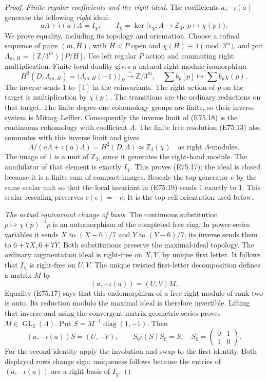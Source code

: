 \begin{proof}
\emph{Finite regular coefficients and the right ideal.}
The coefficients $a,-\iota(a)$ generate the
following \emph{right} ideal:
\[
 a\Lambda+\iota(a)\Lambda=I_\chi,
 \qquad
 I_\chi=\ker\bigl(\epsilon_\chi:\Lambda\to\mathbb Z_3,
                         \ p\mapsto\chi(p)\bigr).
 \tag{E75.17}
\]
We prove equality, including its topology and
orientation. Choose a cofinal sequence of pairs
$(m,H)$, with $H\triangleleft P$ open and
$\chi(H)\equiv1\pmod{3^m}$, and put
$\Lambda_{m,H}=(\mathbb Z/3^m)[P/H]$.
Use left regular $P$ action and commuting
right multiplication. Finite local duality
\cite[I, Theorem2.1 and Corollary2.3]{E_MilneADT}
gives a natural right-module isomorphism
\[
 H^2(D,\Lambda_{m,H})
   =\bigl(\Lambda_{m,H}(-1)\bigr)_P
   \xrightarrow{\sim}\mathbb Z/3^m,
 \quad
 \sum b_p[p]\longmapsto\sum b_p\chi(p).
 \tag{E75.18}
\]
The inverse sends $1$ to $[1]$ in the
coinvariants. The right action of $p$ on the
target is multiplication by $\chi(p)$.
The transitions are the ordinary reductions
on that target. The finite degree-one
cohomology groups are finite, so their inverse
system is Mittag--Leffler. Consequently the
inverse limit of (E75.18) is the continuous
cohomology with coefficient $\Lambda$.
The finite free resolution (E75.13) also
commutes with this inverse limit and gives
\[
 \Lambda/(a\Lambda+\iota(a)\Lambda)
       =H^2(D,\Lambda)\simeq\mathbb Z_3(\chi)
       \quad\text{as right }\Lambda\text{-modules}.
 \tag{E75.19}
\]
The image of $1$ is a unit of $\mathbb Z_3$,
since it generates the right-hand module.
The annihilator of that element is exactly
$I_\chi$. This proves (E75.17); the ideal is
closed because it is a finite sum of compact
images. Rescale the top generator $e$ by the
same scalar unit so that the local invariant
in (E75.19) sends $1$ exactly to $1$.
This scalar rescaling preserves $c(e)=-e$.
It is the top-cell orientation used below.

\emph{The actual equivariant change of basis.}
The continuous substitution $p\mapsto\chi(p)^{-1}p$
is an automorphism of the completed free ring.
In power-series variables it sends
$X$ to $(X-6)/7$ and $Y$ to $(Y-6)/7$;
its inverse sends them to $6+7X,6+7Y$.
Both substitutions preserve the maximal-ideal
topology. The ordinary augmentation ideal is
right-free on $X,Y$, by unique first letter.
It follows that $I_\chi$ is right-free on
$U,V$. The unique twisted first-letter
decomposition defines a matrix $M$ by
\[
 (a,-\iota(a))=(U,V)M.
 \tag{E75.20}
\]
Equality (E75.17) says that this endomorphism
of a free right module of rank two is onto.
Its reduction modulo the maximal ideal is
therefore invertible. Lifting that inverse and
using the convergent matrix geometric series
proves $M\in\operatorname{GL}_2(\Lambda)$.
Put $S=M^{-1}\operatorname{diag}(1,-1)$.
Then
\[
 (a,-\iota(a))S=(U,-V),\qquad
 S_0\iota(S)S_0=S,\quad
 S_0=\begin{pmatrix}0&1\\1&0\end{pmatrix}.
 \tag{E75.21}
\]
For the second identity apply the involution
and swap to the first identity. Both displayed
rows change sign; uniqueness follows because
the entries of $(a,-\iota(a))$ are a right
basis of $I_\chi$.


\end{proof}

